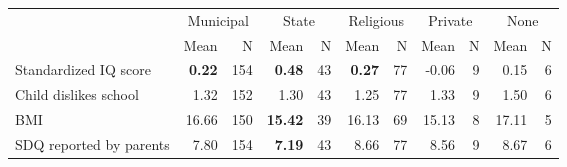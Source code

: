 \begin{tabular}{l r r r r r r r r r r}
\toprule
& \multicolumn{2}{c}{Municipal} & \multicolumn{2}{c}{State} & \multicolumn{2}{c}{Religious} & \multicolumn{2}{c}{Private} & \multicolumn{2}{c}{None} \\
& \scriptsize Mean & \scriptsize N & \scriptsize Mean & \scriptsize N & \scriptsize Mean & \scriptsize N & \scriptsize Mean & \scriptsize N & \scriptsize Mean & \scriptsize N \\
\midrule
Standardized IQ score & \textbf{     0.22} &       154 & \textbf{     0.48} &        43 & \textbf{     0.27} &        77 &     -0.06 &         9 &      0.15 &         6 \\
Child dislikes school &      1.32 &       152 &      1.30 &        43 &      1.25 &        77 &      1.33 &         9 &      1.50 &         6 \\
BMI &     16.66 &       150 & \textbf{    15.42} &        39 &     16.13 &        69 &     15.13 &         8 &     17.11 &         5 \\
SDQ reported by parents &      7.80 &       154 & \textbf{     7.19} &        43 &      8.66 &        77 &      8.56 &         9 &      8.67 &         6 \\
\bottomrule
\end{tabular}
